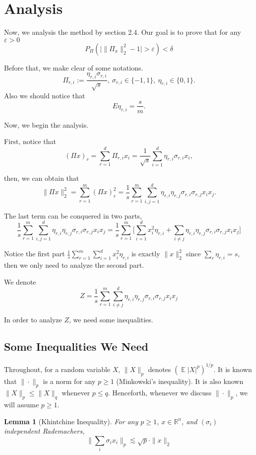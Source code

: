 \documentclass[11pt]{article}
\DeclareMathOperator*{\E}{\mathbb{E}}
\newcommand{\R}{\mathbb{R}}
\newtheorem{lemma}[theorem]{Lemma}
\begin{document}
\section{Analysis}

Now, we analysis the method by section 2.4.
Our goal is to prove that for any $\varepsilon>0$
$$P_{\Pi}(\big|\|\Pi_x\|^2_2-1\big|>\varepsilon)<\delta$$

Before that, we make clear of some notations.
$$\Pi_{r,i}:=\frac{\eta_{r,i}\sigma_{r,i}}{\sqrt{s}},~\sigma_{r,i}\in\{-1,1\},~\eta_{r,i}\in\{0,1\}.$$
Also we should notice that $$E\eta_{r,i}=\frac{s}{m}.$$

Now, we begin the analysis.

First, notice that 
$$(\Pi x)_r=\sum_{r=1}^d\Pi_{r,i}x_i=\frac{1}{\sqrt{s}}\sum_{i=1}^d\eta_{r,i}\sigma_{r,i}x_i,$$

then, we can obtain that
$$\|\Pi x\|_2^2=\sum_{r=1}^m(\Pi x)^2_r=\frac{1}{s}\sum_{r=1}^m\sum_{i,j=1}^d\eta_{r,i}\eta_{r,j}\sigma_{r,i}\sigma_{r,j}x_ix_j. $$

The last term can be conquered in two parts, 
$$\frac{1}{s}\sum_{r=1}^m\sum_{i,j=1}^d\eta_{r,i}\eta_{r,j}\sigma_{r,i}\sigma_{r,j}x_ix_j=\frac{1}{s}\sum_{r=1}^m\big[\sum_{i=1}^d x_i^2\eta_{r,i}+\sum_{i\neq j}\eta_{r,i}\eta_{r,j}\sigma_{r,i}\sigma_{r,j}x_ix_j\big]$$

Notice the first part $\frac{1}{s}\sum_{r=1}^m\sum_{i=1}^d x_i^2\eta_{r,i}$ is exactly $\|x\|^2_2$ since $\sum_{r}\eta_{r,i}=s$, then we only need to analyze the second part.

We denote 
$$Z=\frac{1}{s}\sum_{r=1}^m\sum_{i\neq j}^d\eta_{r,i}\eta_{r,j}\sigma_{r,i}\sigma_{r,j}x_ix_j$$

In order to analyze $Z$, we need some inequalities.


\subsection{Some Inequalities We Need}
Throughout, for a random variable $X$, $\|X\|_p$ denotes $(\E|X|^p)^{1/p}$. It is known that $\|\cdot\|_p$ is a norm for any $p\ge 1$ (Minkowski's inequality). It is also known $\|X\|_p \le \|X\|_q$ whenever $p\le q$. Henceforth, whenever we discuss $\|\cdot\|_p$, we will assume $p\ge 1$.

\begin{lemma}[Khintchine Inequality]
For any $p\ge 1$, $x\in\R^n$, and $(\sigma_i)$ independent Rademachers,
$$
\|\sum_i \sigma_i x_i\|_p \lesssim \sqrt{p}\cdot \|x\|_2
$$
\end{lemma}
\end{document}
